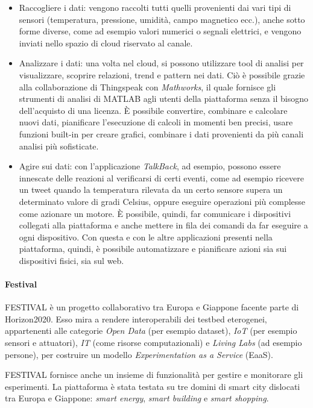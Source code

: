 \begin{itemize}
    \item Raccogliere i dati: vengono raccolti tutti quelli provenienti dai vari tipi di sensori (temperatura, pressione, umidità, campo magnetico ecc.), anche sotto forme diverse, come ad esempio valori numerici o segnali elettrici, e vengono inviati nello spazio di cloud riservato al canale.
    \item Analizzare i dati: una volta nel cloud, si possono utilizzare tool di analisi per visualizzare, scoprire relazioni, trend e pattern nei dati. Ciò è possibile grazie alla collaborazione di Thingspeak con \textit{Mathworks}, il quale fornisce gli strumenti di analisi di MATLAB agli utenti della piattaforma senza il bisogno dell’acquisto di una licenza. È possibile convertire, combinare e calcolare nuovi dati, pianificare l’esecuzione di calcoli in momenti ben precisi, usare funzioni built-in per creare grafici, combinare i dati provenienti da più canali analisi più sofisticate. 
    \item Agire sui dati: con l’applicazione \textit{TalkBack}, ad esempio, possono essere innescate delle reazioni al verificarsi di certi eventi, come ad esempio ricevere un tweet quando la temperatura rilevata da un certo sensore supera un determinato valore di gradi Celsius, oppure eseguire operazioni più complesse come azionare un motore. È possibile, quindi, far comunicare i dispositivi collegati alla piattaforma e anche mettere in fila dei comandi da far eseguire a ogni dispositivo. Con questa e con le altre applicazioni presenti nella piattaforma, quindi, è possibile automatizzare e pianificare azioni sia sui dispositivi fisici, sia sul web.
\end{itemize}

\paragraph{Festival}
\label{c:tec:virt:fest}

FESTIVAL è un progetto collaborativo tra Europa e Giappone facente parte di Horizon2020. Esso mira a rendere interoperabili dei testbed eterogenei, appartenenti alle categorie \textit{Open Data} (per esempio dataset), \textit{IoT} (per esempio sensori e attuatori), \textit{IT} (come risorse computazionali) e \textit{Living Labs} (ad esempio persone), per costruire un modello \textit{Experimentation as a Service} (EaaS).

FESTIVAL fornisce anche un insieme di funzionalità per gestire e monitorare gli esperimenti. La piattaforma è stata testata su tre domini di smart city dislocati tra Europa e Giappone: \textit{smart energy}, \textit{smart building} e \textit{smart shopping}.

